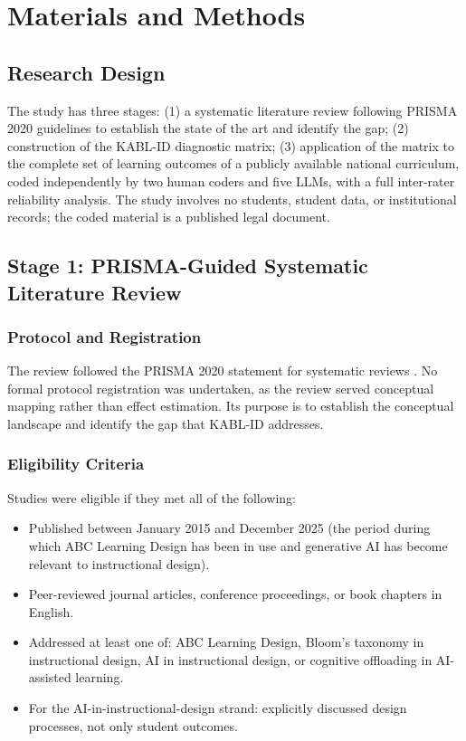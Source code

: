 \documentclass[journal,article,submit,pdftex,moreauthors]{Definitions/mdpi}
\begin{document}
\section{Materials and Methods}
\label{sec:method}

\subsection{Research Design}

The study has three stages: (1) a systematic literature review following PRISMA 2020 guidelines to establish the state of the art and identify the gap; (2) construction of the KABL-ID diagnostic matrix; (3) application of the matrix to the complete set of learning outcomes of a publicly available national curriculum, coded independently by two human coders and five LLMs, with a full inter-rater reliability analysis. The study involves no students, student data, or institutional records; the coded material is a published legal document.

\subsection{Stage 1: PRISMA-Guided Systematic Literature Review}
\label{sec:prisma}

\subsubsection{Protocol and Registration}

The review followed the PRISMA 2020 statement for systematic reviews \cite{page_prisma_2021}. No formal protocol registration was undertaken, as the review served conceptual mapping rather than effect estimation. Its purpose is to establish the conceptual landscape and identify the gap that KABL-ID addresses.

\subsubsection{Eligibility Criteria}
\label{sec:eligibility}

Studies were eligible if they met all of the following:
\begin{itemize}[leftmargin=*]
  \item Published between January 2015 and December 2025 (the period during which ABC Learning Design has been in use and generative AI has become relevant to instructional design).
  \item Peer-reviewed journal articles, conference proceedings, or book chapters in English.
  \item Addressed at least one of: ABC Learning Design, Bloom's taxonomy in instructional design, AI in instructional design, or cognitive offloading in AI-assisted learning.
  \item For the AI-in-instructional-design strand: explicitly discussed design processes, not only student outcomes.
\end{itemize}
\end{document}
